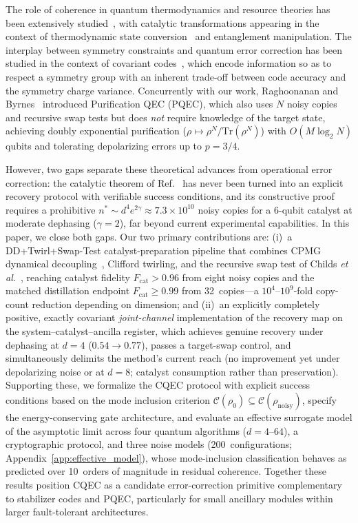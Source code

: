 \documentclass[pra,twocolumn,superscriptaddress,longbibliography,floatfix]{revtex4-2}
\begin{document}
The role of coherence in quantum thermodynamics and resource theories has been extensively studied~\cite{Lostaglio2019,Streltsov2017,Marvian2014}, with catalytic transformations appearing in the context of thermodynamic state conversion~\cite{Baumgratz2014} and entanglement manipulation.
The interplay between symmetry constraints and quantum error correction has been studied in the context of covariant codes~\cite{Faist2020,Hayden2008,Eastin2009}, which encode information so as to respect a symmetry group with an inherent trade-off between code accuracy and the symmetry charge variance.
Concurrently with our work, Raghoonanan and Byrnes~\cite{Raghoonanan2026} introduced Purification QEC (PQEC), which also uses $N$ noisy copies and recursive swap tests but does \emph{not} require knowledge of the target state, achieving doubly exponential purification ($\rho \mapsto \rho^N / \mathrm{Tr}(\rho^N)$) with $O(M \log_2 N)$ qubits and tolerating depolarizing errors up to $p = 3/4$.

However, two gaps separate these theoretical advances from operational error correction: the catalytic theorem of Ref.~\cite{Shiraishi2024} has never been turned into an explicit recovery protocol with verifiable success conditions, and its constructive proof requires a prohibitive $n^* \sim d^4 e^{2\gamma} \approx 7.3 \times 10^{10}$ noisy copies for a 6-qubit catalyst at moderate dephasing ($\gamma = 2$), far beyond current experimental capabilities.
In this paper, we close both gaps.
Our two primary contributions are:
(i)~a DD+Twirl+Swap-Test catalyst-preparation pipeline that combines CPMG dynamical decoupling~\cite{Viola1999,MeiboomGill1958}, Clifford twirling, and the recursive swap test of Childs \emph{et al.}~\cite{Childs2025,Yao2025,Zhao2026}, reaching catalyst fidelity $F_\mathrm{cat} > 0.96$ from eight noisy copies and the matched distillation endpoint $F_\mathrm{cat} \geq 0.99$ from 32~copies---a $10^{4}$--$10^{9}$-fold copy-count reduction depending on dimension;
and (ii)~an explicitly completely positive, exactly covariant \emph{joint-channel} implementation of the recovery map on the system--catalyst--ancilla register, which achieves genuine recovery under dephasing at $d = 4$ ($0.54 \to 0.77$), passes a target-swap control, and simultaneously delimits the method's current reach (no improvement yet under depolarizing noise or at $d = 8$; catalyst consumption rather than preservation).
Supporting these, we formalize the CQEC protocol with explicit success conditions based on the mode inclusion criterion $\mathcal{C}(\rho_0) \subseteq \mathcal{C}(\rho_\mathrm{noisy})$, specify the energy-conserving gate architecture, and evaluate an effective surrogate model of the asymptotic limit across four quantum algorithms ($d = 4$--$64$), a cryptographic protocol, and three noise models (200~configurations; Appendix~\ref{app:effective_model}), whose mode-inclusion classification behaves as predicted over 10~orders of magnitude in residual coherence.
Together these results position CQEC as a candidate error-correction primitive complementary to stabilizer codes and PQEC, particularly for small ancillary modules within larger fault-tolerant architectures.
\end{document}
